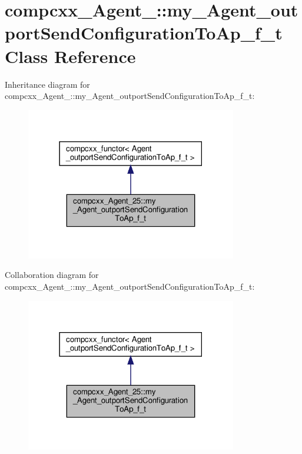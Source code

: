 \hypertarget{classcompcxx__Agent__25_1_1my__Agent__outportSendConfigurationToAp__f__t}{}\section{compcxx\+\_\+\+Agent\+\_\+:\+:my\+\_\+\+Agent\+\_\+outport\+Send\+Configuration\+To\+Ap\+\_\+f\+\_\+t Class Reference}
\label{classcompcxx__Agent__25_1_1my__Agent__outportSendConfigurationToAp__f__t}


Inheritance diagram for compcxx\+\_\+\+Agent\+\_\+:\+:my\+\_\+\+Agent\+\_\+outport\+Send\+Configuration\+To\+Ap\+\_\+f\+\_\+t\+:\nopagebreak
\begin{figure}[H]
\begin{center}
\leavevmode
\includegraphics[width=261pt]{classcompcxx__Agent__25_1_1my__Agent__outportSendConfigurationToAp__f__t__inherit__graph}
\end{center}
\end{figure}


Collaboration diagram for compcxx\+\_\+\+Agent\+\_\+:\+:my\+\_\+\+Agent\+\_\+outport\+Send\+Configuration\+To\+Ap\+\_\+f\+\_\+t\+:\nopagebreak
\begin{figure}[H]
\begin{center}
\leavevmode
\includegraphics[width=261pt]{classcompcxx__Agent__25_1_1my__Agent__outportSendConfigurationToAp__f__t__coll__graph}
\end{center}
\end{figure}

